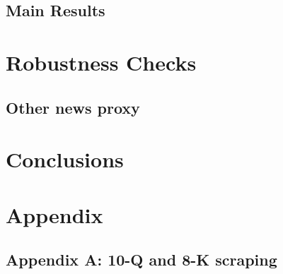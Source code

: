 \documentclass[a4paper]{article}
\begin{document}
\begin{spacing}{2}
\subsection{Main Results}

\section{Robustness Checks}

\subsection{Other news proxy}

\section{Conclusions}

\end{spacing}

\newpage
\section{Appendix}
\subsection{Appendix A: 10-Q and 8-K scraping}
\end{document}
